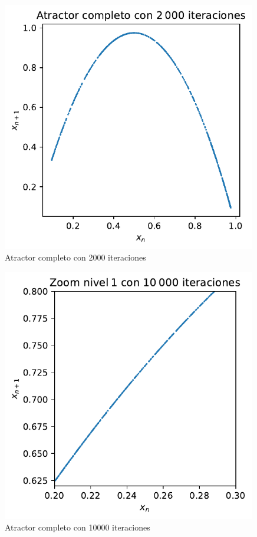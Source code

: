 \documentclass[
  10pt,
  a4paper,
  DIV=11,
  numbers=noendperiod,
  open=any]{scrreprt}
\numberwithin{equation}{chapter}
\numberwithin{equation}{section}
\renewcommand{\[}{\begin{equation}}
\renewcommand{\]}{\end{equation}}
\begin{document}
\begin{figure}[h]
  \centering
  \includegraphics[width=0.99\textwidth]{04-clima/atractor_files/figure-pdf/cell-6-output-1.pdf}
  \caption{Atractor completo con 2000 iteraciones}
\end{figure}

\begin{figure}[h]
  \centering
  \includegraphics[width=0.99\textwidth]{04-clima/atractor_files/figure-pdf/cell-6-output-2.pdf}
  \caption{Atractor completo con 10000 iteraciones}
\end{figure}
\end{document}
